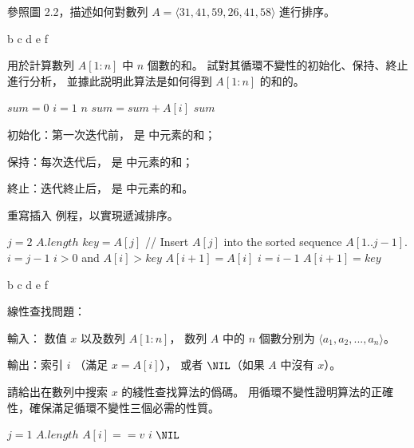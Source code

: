 \startsection[
  title={Insertion sort},
]

\startEXERCISE
參照圖 2.2，描述如何對數列 $A = \langle 31, 41, 59, 26, 41, 58\rangle$ 進行排序。
\stopEXERCISE

\startANSWER
{}
{\externalfigure[output/e2_1_1-2]}{b}
{\externalfigure[output/e2_1_1-3]}{c}
{\externalfigure[output/e2_1_1-4]}{d}
{\externalfigure[output/e2_1_1-5]}{e}
{\externalfigure[output/e2_1_1-6]}{f}
\stopcombination
\stopANSWER

\startEXERCISE
{} 用於計算數列 $A[1:n]$ 中 $n$ 個數的和。
試對其循環不變性的初始化、保持、終止進行分析，
並據此説明此算法是如何得到 $A[1:n]$ 的和的。

\startCLRSCODE
$sum = 0$
\For $i = 1$ \To $n$
	$sum = sum + A[i]$
\Return $sum$
\stopCLRSCODE
\stopEXERCISE

\startANSWER
\startigBase
\item 初始化：第一次迭代前，  是  中元素的和；
\item 保持：每次迭代后，  是  中元素的和；
\item 終止：迭代終止后，  是  中元素的和。
\stopigBase
\stopANSWER

\startEXERCISE
重寫插入 例程，以實現遞減排序。
\stopEXERCISE
\startANSWER

\startCLRSCODE
\For $j = 2$ \To $A.length$
	$key = A[j]$
	// Insert $A[j]$ into the sorted sequence $A[1 .. j-1]$.
	$i = j - 1$
	\While $i > 0$ and $A[i] > key$
		$A[i+1] = A[i]$
		$i = i - 1$
	$A[i + 1] = key$
\stopCLRSCODE

{\externalfigure[output/e2_1_2-2]}{b}
{\externalfigure[output/e2_1_2-3]}{c}
{\externalfigure[output/e2_1_2-4]}{d}
{\externalfigure[output/e2_1_2-5]}{e}
{\externalfigure[output/e2_1_2-6]}{f}
\stopcombination
\stopANSWER

線性查找問題：

輸入： 数值 $x$ 以及数列 $A[1:n]$，
数列 $A$ 中的 $n$ 個數分别为 $\langle a_1, a_2, ..., a_n \rangle$。

輸出：索引 $i$ （滿足 $x = A[i]$），
或者 $\NIL$（如果 $A$ 中沒有 $x$）。

請給出在數列中搜索 $x$ 的綫性查找算法的僞碼。
用循環不變性證明算法的正確性，確保滿足循環不變性三個必需的性質。
\stopEXERCISE

\startANSWER
\startCLRSCODE
\For $j = 1$ \To $A.length$
	\If $A[i] == v$
		\Return $i$
\Return $\NIL$
\stopCLRSCODE
\stopANSWER

